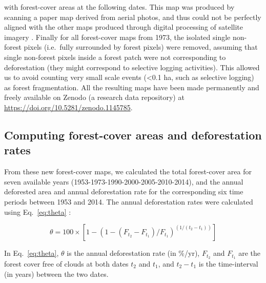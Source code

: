 \documentclass[a4paper, 12pt, leqno]{article} %
\begin{document}
with forest-cover areas at the following dates. This map was produced
by scanning a paper map derived from aerial photos, and thus could not
be perfectly aligned with the other maps produced through digital
processing of satellite imagery \citep{Harper2007}. Finally for all
forest-cover maps from 1973, the isolated single non-forest pixels
(i.e.~fully surrounded by forest pixels) were removed, assuming that
single non-forest pixels inside a forest patch were not corresponding
to deforestation (they might correspond to selective logging
activities). This allowed us to avoid counting very small scale events
(\textless 0.1 ha, such as selective logging) as forest
fragmentation. All the resulting maps have been made permanently and
freely available on Zenodo (a research data repository) at
\url{https://doi.org/10.5281/zenodo.1145785}.

\subsection{Computing forest-cover areas and deforestation rates}

From these new forest-cover maps, we calculated the total forest-cover
area for seven available years (1953-1973-1990-2000-2005-2010-2014),
and the annual deforested area and annual deforestation rate for the
corresponding six time periods between 1953 and 2014. The annual
deforestation rates were calculated using Eq.~\ref{eq:theta}
\citep{Puyravaud2003, Vieilledent2013}:

\begin{equation}
  \label{eq:theta}
  \theta = 100 \times [1-(1-(F_{t_2}-F_{t_1})/F_{t_1})^{(1/(t_2-t_1))}]
\end{equation}

In Eq.~\ref{eq:theta}, $\theta$ is the annual deforestation rate (in \%/yr),
$F_{t_2}$ and $F_{t_1}$ are the forest cover free of clouds at both
dates $t_2$ and $t_1$, and $t_2-t_1$ is the time-interval (in
years) between the two dates.
\end{document}
